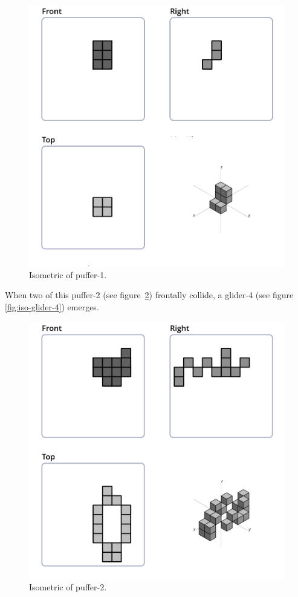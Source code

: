 \begin{figure}
  \centering
  \includegraphics[scale=0.4]{iso_settings/puffer_1v.png}
  \caption{Isometric of puffer-1.}
  \label{fig:iso-puffer-1v}
\end{figure}

When two of this puffer-2 (see figure~\ref{fig:iso-puffer-2}) frontally collide,
a glider-4 (see figure \ref{fig:iso-glider-4}) emerges.
\begin{figure}
	\centering
	\includegraphics[scale=0.4]{iso_settings/puffer_2.png}
	\caption{Isometric of puffer-2.}
  \label{fig:iso-puffer-2}
\end{figure}

